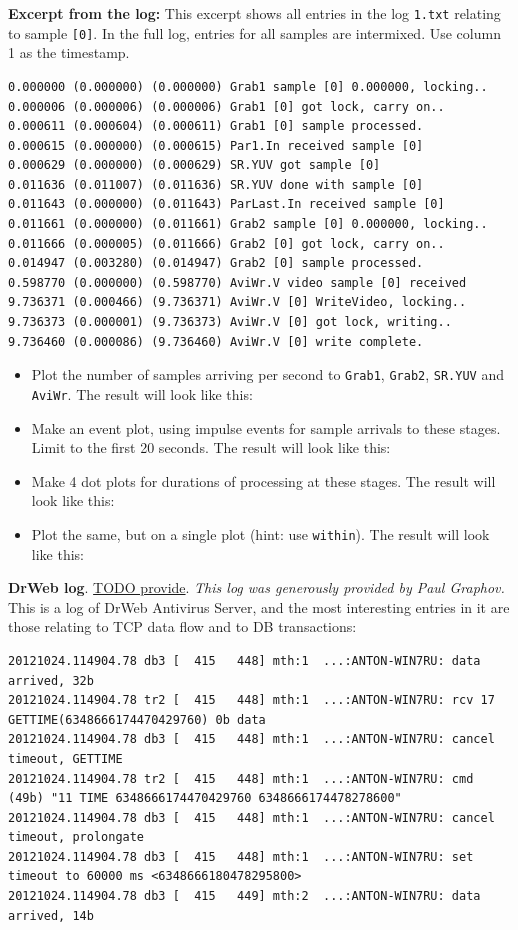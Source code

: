 \documentclass{article}
\begin{document}
\textbf{Excerpt from the log:}
This excerpt shows all entries in the log \verb|1.txt| relating to sample \verb|[0]|. In the full log, entries for all samples are intermixed. Use column 1 as the timestamp.
\begin{verbatim}
0.000000 (0.000000) (0.000000) Grab1 sample [0] 0.000000, locking..
0.000006 (0.000006) (0.000006) Grab1 [0] got lock, carry on..
0.000611 (0.000604) (0.000611) Grab1 [0] sample processed.
0.000615 (0.000000) (0.000615) Par1.In received sample [0]
0.000629 (0.000000) (0.000629) SR.YUV got sample [0]
0.011636 (0.011007) (0.011636) SR.YUV done with sample [0]
0.011643 (0.000000) (0.011643) ParLast.In received sample [0]
0.011661 (0.000000) (0.011661) Grab2 sample [0] 0.000000, locking..
0.011666 (0.000005) (0.011666) Grab2 [0] got lock, carry on..
0.014947 (0.003280) (0.014947) Grab2 [0] sample processed.
0.598770 (0.000000) (0.598770) AviWr.V video sample [0] received
9.736371 (0.000466) (9.736371) AviWr.V [0] WriteVideo, locking..
9.736373 (0.000001) (9.736373) AviWr.V [0] got lock, writing..
9.736460 (0.000086) (9.736460) AviWr.V [0] write complete.
\end{verbatim}

\begin{itemize}
 \item Plot the number of samples arriving per second to \verb|Grab1|, \verb|Grab2|, \verb|SR.YUV| and \verb|AviWr|. The result will look like this: 
 \item Make an event plot, using impulse events for sample arrivals to these stages. Limit to the first 20 seconds. The result will look like this: 
 \item Make 4 dot plots for durations of processing at these stages. The result will look like this: 
 \item Plot the same, but on a single plot (hint: use \verb|within|). The result will look like this: 
\end{itemize}

\textbf{DrWeb log}. \url{TODO provide}. \emph{This log was generously provided by Paul Graphov.} This is a log of DrWeb Antivirus Server, and the most interesting entries in it are those relating to TCP data flow and to DB transactions:

\begin{verbatim}
20121024.114904.78 db3 [  415   448] mth:1  ...:ANTON-WIN7RU: data arrived, 32b
20121024.114904.78 tr2 [  415   448] mth:1  ...:ANTON-WIN7RU: rcv 17 GETTIME(6348666174470429760) 0b data
20121024.114904.78 db3 [  415   448] mth:1  ...:ANTON-WIN7RU: cancel timeout, GETTIME
20121024.114904.78 tr2 [  415   448] mth:1  ...:ANTON-WIN7RU: cmd (49b) "11 TIME 6348666174470429760 6348666174478278600"
20121024.114904.78 db3 [  415   448] mth:1  ...:ANTON-WIN7RU: cancel timeout, prolongate
20121024.114904.78 db3 [  415   448] mth:1  ...:ANTON-WIN7RU: set timeout to 60000 ms <6348666180478295800>
20121024.114904.78 db3 [  415   449] mth:2  ...:ANTON-WIN7RU: data arrived, 14b
\end{verbatim}
\end{document}
